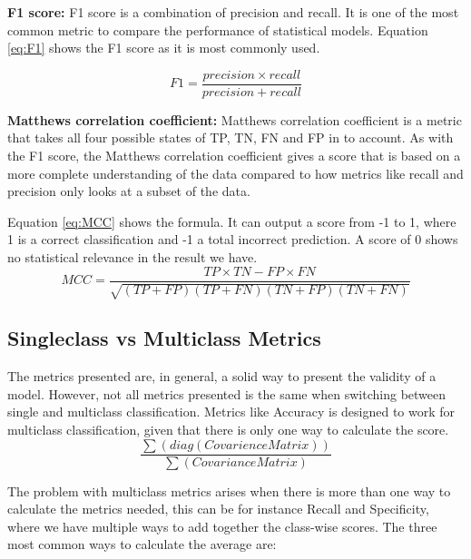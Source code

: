 \vspace{5px}
\textbf{F1 score:}
F1 score is a combination of precision and recall. It is one of the most common metric to compare the performance of statistical models.
Equation \ref{eq:F1} shows the F1 score as it is most commonly used.

\begin{equation}
F1=\frac{precision \times recall}{precision + recall}
\label{eq:F1}
\end{equation}



\vspace{5px}
\textbf{Matthews correlation coefficient:}
Matthews correlation coefficient is a metric that takes all four possible states of TP, TN, FN and FP in to account. As with the F1 score, the Matthews correlation coefficient gives a score that is based on a more complete understanding of the data compared to how metrics like recall and precision only looks at a subset of the data.

Equation \ref{eq:MCC} shows the formula. It can output a score from -1 to 1, where 1 is a correct classification and -1 a total incorrect prediction. A score of 0 shows no statistical relevance in the result we have.
\begin{equation}
MCC=\frac{TP \times TN - FP \times FN}{\sqrt{(TP + FP)(TP + FN)(TN + FP)(TN + FN)}}
\label{eq:MCC}
\end{equation}







\subsection{Singleclass vs Multiclass Metrics}

The metrics presented are, in general, a solid way to present the validity of a model. However, not all metrics presented is the same when switching between single and multiclass classification.  Metrics like Accuracy is designed to work for multiclass classification, given that there is only one way to calculate the score.
\begin{equation}
\frac{\sum (diag(Covarience Matrix))}{\sum(Covariance Matrix)}
\label{eq:ACCalt}
\end{equation}

The problem with multiclass metrics arises when there is more than one way to calculate the metrics needed, this can be for instance Recall and Specificity, where we have multiple ways to add together the class-wise scores. The three most common ways to calculate the average are:


